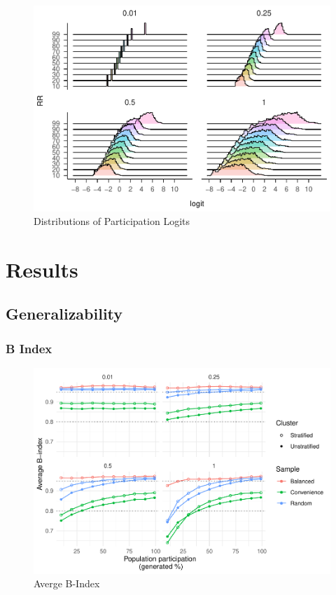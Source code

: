 \documentclass[
  english,
  man,floatsintext]{apa6}
\begin{document}
\begin{figure}
\centering
\includegraphics{5---Analysis_files/figure-latex/unnamed-chunk-13-1.pdf}
\caption{\label{fig:unnamed-chunk-13}Distributions of Participation Logits}
\end{figure}

\hypertarget{results}{%
\section{Results}\label{results}}

\hypertarget{generalizability}{%
\subsection{Generalizability}\label{generalizability}}

\hypertarget{b-index}{%
\subsubsection{B Index}\label{b-index}}

\begin{figure}
\centering
\includegraphics{5---Analysis_files/figure-latex/unnamed-chunk-15-1.pdf}
\caption{\label{fig:unnamed-chunk-15}Averge B-Index}
\end{figure}
\end{document}

